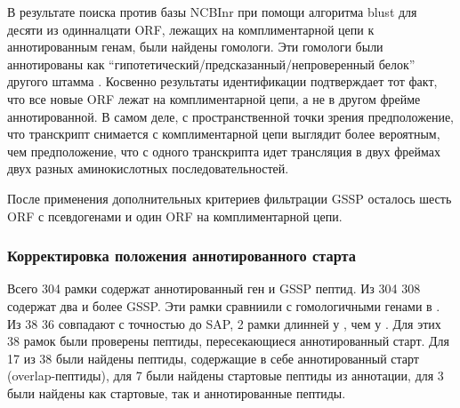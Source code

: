 В результате поиска против базы NCBInr при помощи алгоритма blust для десяти из одинналцати ORF, лежащих на комплиментарной цепи к аннотированным генам, были найдены гомологи. Эти гомологи были аннотированы как “гипотетический/предсказанный/непроверенный белок” другого штамма . Косвенно результаты идентификации подтверждает тот факт, что все новые ORF лежат на комплиментарной цепи, а не в другом фрейме аннотированной. В самом деле, с пространственной точки зрения предположение, что транскрипт снимается с комплиментарной цепи выглядит более вероятным, чем предположение, что с одного транскрипта идет трансляция в двух фреймах двух разных аминокислотных последовательностей.

После применения дополнительных критериев фильтрации GSSP осталось шесть ORF с псевдогенами и один ORF на комплиментарной цепи.

\subsubsection{Корректировка положения аннотированного старта}
Всего 304 рамки содержат аннотированный ген и GSSP пептид. Из 304 308 содержат два и более GSSP. Эти рамки сравниили с гомологичными генами в . Из 38 36 совпадают с точностью до SAP, 2 рамки длинней у , чем у . Для этих 38 рамок были проверены пептиды, пересекающиеся аннотированный старт. Для 17 из 38 были найдены пептиды, содержащие в себе аннотированный старт (overlap-пептиды), для 7 были найдены стартовые пептиды из аннотации, для 3 были найдены как стартовые, так и аннотированные пептиды.




\newpage


































